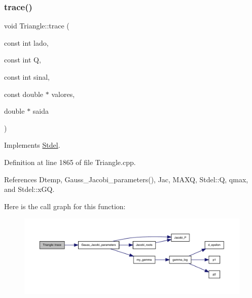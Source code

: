 \subsubsection{\texorpdfstring{trace()}{trace()}}
{\footnotesize\ttfamily void Triangle\+::trace (\begin{DoxyParamCaption}\item[{const int}]{lado,  }\item[{const int}]{Q,  }\item[{const int}]{sinal,  }\item[{const double $\ast$}]{valores,  }\item[{double $\ast$}]{saida }\end{DoxyParamCaption})\hspace{0.3cm}{\ttfamily [virtual]}}



Implements \hyperlink{classStdel_aeb2fe03bbd8af61e503e29d3dd5ae4f0}{Stdel}.



Definition at line 1865 of file Triangle.\+cpp.



References Dtemp, Gauss\+\_\+\+Jacobi\+\_\+parameters(), Jac, M\+A\+XQ, Stdel\+::Q, qmax, and Stdel\+::x\+GQ.

Here is the call graph for this function\+:
\nopagebreak
\begin{figure}[H]
\begin{center}
\leavevmode
\includegraphics[width=350pt]{classTriangle_a1361a3e5ff11ed02786bf62325a2614f_cgraph}
\end{center}
\end{figure}
\mbox{\label{classTriangle_afc023a739048c1294b8417bfec3afb7a}} 

